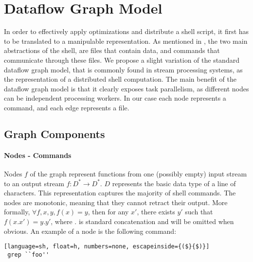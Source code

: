 \documentclass[sigplan,10pt,review,anonymous]{acmart}
\newcommand{\nv}[1]{[{\color{cyan}#1 --- Nikos}]}
\newcommand{\tr}[1]{} %
\begin{document}
\tr{Can we find a solution for the commands in coreutils?}


\section{Dataflow Graph Model}
\label{ir}

In order to effectively apply optimizations and distribute a shell
script, it first has to be translated to a manipulable
representation. As mentioned in , the two main
abstractions of the shell, are files that contain data, and commands
that communicate through these files. We propose a slight variation of
the standard dataflow graph model, that is commonly found in stream
processing systems, as the representation of a distributed shell
computation. The main benefit of the dataflow graph model is that it
clearly exposes task parallelism, as different nodes can be
independent processing workers. In our case each node represents a
command, and each edge represents a file.

\subsection{Graph Components}

\paragraph{Nodes - Commands}

Nodes $f$ of the graph represent functions from one (possibly empty)
input stream to an output stream $f : D^* \rightarrow D^*$. $D$
represents the basic data type of a line of characters. This
representation captures the majority of shell commands. The nodes are
monotonic, meaning that they cannot retract their output. More
formally, $\forall f, x, y, f(x) = y$, then for any $x'$, there exists
$y'$ such that $f(x.x') = y.y'$, where $.$ is standard concatenation
and will be omitted when obvious. An example of a node is the
following command:

\begin{lstlisting}[language=sh, float=h, numbers=none, escapeinside={($}{$)}]
 grep ``foo''
\end{lstlisting}
\end{document}
